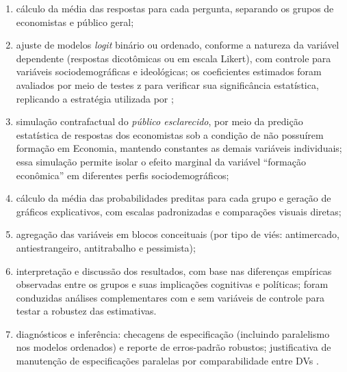\begin{enumerate}[label=\alph*)]
    \item cálculo da média das respostas para cada pergunta, separando os grupos de economistas e público geral;
    
    \item ajuste de modelos \textit{logit} binário ou ordenado, conforme a natureza da variável dependente (respostas dicotômicas ou em escala Likert), com controle para variáveis sociodemográficas e ideológicas; os coeficientes estimados foram avaliados por meio de testes z para verificar sua significância estatística, replicando a estratégia utilizada por ;
    
    \item simulação contrafactual do \textit{público esclarecido}, por meio da predição estatística de respostas dos economistas sob a condição de não possuírem formação em Economia, mantendo constantes as demais variáveis individuais; essa simulação permite isolar o efeito marginal da variável ``formação econômica'' em diferentes perfis sociodemográficos;
    
    \item cálculo da média das probabilidades preditas para cada grupo e geração de gráficos explicativos, com escalas padronizadas e comparações visuais diretas;
    
    \item agregação das variáveis em blocos conceituais (por tipo de viés: antimercado, antiestrangeiro, antitrabalho e pessimista);
    
    \item interpretação e discussão dos resultados, com base nas diferenças empíricas observadas entre os grupos e suas implicações cognitivas e políticas; foram conduzidas análises complementares com e sem variáveis de controle para testar a robustez das estimativas.

    
    \item diagnósticos e inferência: checagens de especificação (incluindo paralelismo nos modelos ordenados) e reporte de erros-padrão robustos; justificativa de manutenção de especificações paralelas por comparabilidade entre DVs \cite{stigum2003}.

\end{enumerate}

